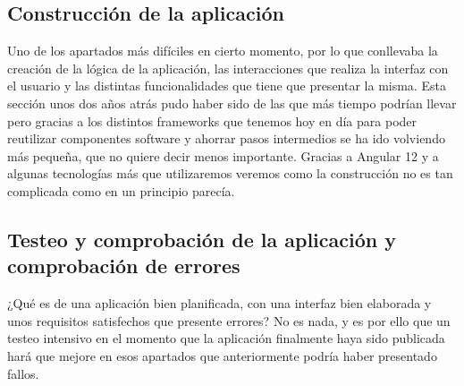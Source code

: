 \subsection{Construcción de la aplicación}

Uno de los apartados más difíciles en cierto momento, por lo que conllevaba la creación de la lógica de la aplicación, las interacciones que realiza la interfaz con el usuario y las distintas funcionalidades que tiene que presentar la misma. Esta sección unos dos años atrás pudo haber sido de las que más tiempo podrían llevar pero gracias a los distintos frameworks que tenemos hoy en día para poder reutilizar componentes software y ahorrar pasos intermedios se ha ido volviendo más pequeña, que no quiere decir menos importante. Gracias a Angular 12 y a algunas tecnologías más que utilizaremos veremos como la construcción no es tan complicada como en un principio parecía.

\subsection{Testeo y comprobación de la aplicación y comprobación de errores}

¿Qué es de una aplicación bien planificada, con una interfaz bien elaborada y unos requisitos satisfechos que presente errores? No es nada, y es por ello que un testeo intensivo en el momento que la aplicación finalmente haya sido publicada hará que mejore en esos apartados que anteriormente podría haber presentado fallos.



